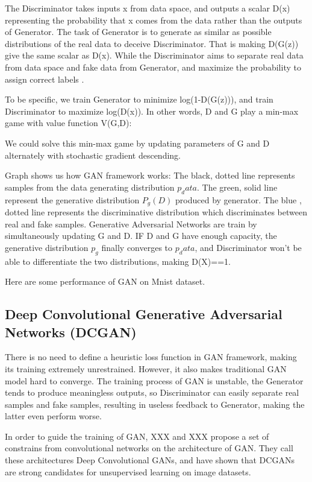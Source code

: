 The Discriminator takes inputs x from data space, and outputs a scalar D(x) representing the probability that x comes from the data rather than the outputs of Generator. The task of Generator is to generate as similar as possible distributions of the real data to deceive Discriminator. That is making D(G(z)) give the same scalar as D(x). While the Discriminator aims to separate real data from data space and fake data from Generator, and maximize the probability to assign correct labels .

To be specific, we train Generator to minimize log(1-D(G(z))), and train Discriminator to maximize log(D(x)). In other words, D and G play a min-max game with value function V(G,D):

We could solve this min-max game by updating parameters of G and D alternately with stochastic gradient descending.

Graph shows us how GAN framework works: The black, dotted line represents samples from the data generating distribution $p_data$. The green, solid line represent the generative distribution $P_g(D)$ produced by generator. The blue , dotted line represents the discriminative distribution which discriminates between real and fake samples. Generative Adversarial Networks are train by simultaneously updating G and D. IF D and G have enough capacity, the generative distribution $p_g$ finally converges to $p_data$, and Discriminator won’t be able to differentiate the two distributions, making D(X)==1.

Here are some performance of GAN on Mnist dataset.

\subsection{Deep Convolutional Generative Adversarial Networks (DCGAN)}
There is no need to define a heuristic loss function in GAN framework, making its training extremely unrestrained. However, it also makes traditional GAN model hard to converge. The training process of GAN is unstable, the Generator tends to produce meaningless outputs, so Discriminator can easily separate real samples and fake samples, resulting in useless feedback to Generator, making the latter even perform worse.

In order to guide the training of GAN, XXX and XXX propose a set of constrains from convolutional networks on the architecture of GAN. They call these architectures Deep Convolutional GANs, and have shown that DCGANs are strong candidates for unsupervised learning on image datasets.

